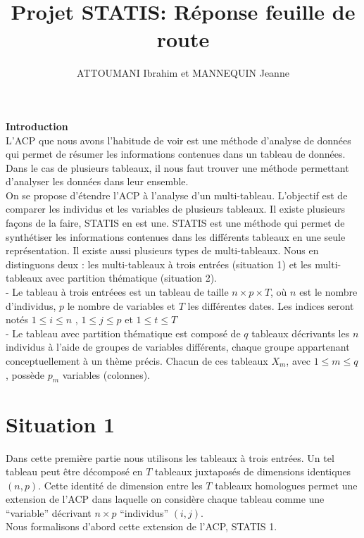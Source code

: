 \documentclass[
]{article}
\title{Projet STATIS: Réponse feuille de route}
\author{ATTOUMANI Ibrahim et MANNEQUIN Jeanne}
\date{}
\begin{document}
\maketitle

{
\setcounter{tocdepth}{3}
\tableofcontents
}
\newpage

\textbf{\textbf{\large Introduction}}\\
\newline L'ACP que nous avons l'habitude de voir est une méthode
d'analyse de données qui permet de résumer les informations contenues
dans un tableau de données. Dans le cas de plusieurs tableaux, il nous
faut trouver une méthode permettant d'analyser les données dans leur
ensemble.\\
On se propose d'étendre l'ACP à l'analyse d'un multi-tableau. L'objectif
est de comparer les individus et les variables de plusieurs tableaux. Il
existe plusieurs façons de la faire, STATIS en est une. STATIS est une
méthode qui permet de synthétiser les informations contenues dans les
différents tableaux en une seule représentation. Il existe aussi
plusieurs types de multi-tableaux. Nous en distinguons deux : les
multi-tableaux à trois entrées (situation 1) et les multi-tableaux avec
partition thématique (situation 2).\\
- Le tableau à trois entréees est un tableau de taille
\(n \times p \times T\), où \(n\) est le nombre d'individus, \(p\) le
nombre de variables et \(T\) les différentes dates. Les indices seront
notés \(1\leq i\leq n\) , \(1\leq j\leq p\) et \(1\leq t\leq T\)\\
- Le tableau avec partition thématique est composé de \(q\) tableaux
décrivants les \(n\) individus à l'aide de groupes de variables
différents, chaque groupe appartenant conceptuellement à un thème
précis. Chacun de ces tableaux \(X_m\), avec \(1\leq m\leq q\), possède
\(p_m\) variables (colonnes).

\hypertarget{situation-1}{%
\section{Situation 1}\label{situation-1}}

Dans cette première partie nous utilisons les tableaux à trois entrées.
Un tel tableau peut être décomposé en \(T\) tableaux juxtaposés de
dimensions identiques \((n,p)\). Cette identité de dimension entre les
\(T\) tableaux homologues permet une extension de l'ACP dans laquelle on
considère chaque tableau comme une ``variable'' décrivant \(n \times p\)
``individus'' \((i,j)\).\\
Nous formalisons d'abord cette extension de l'ACP, STATIS 1.
\end{document}

